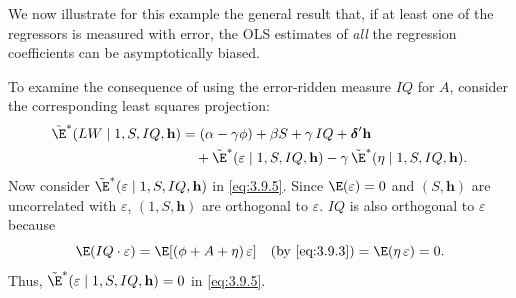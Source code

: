 We now illustrate for this example the general result that, if at least one of the
regressors is measured with error, the OLS estimates of \emph{all} the regression coefficients
can be asymptotically biased.

To examine the consequence of using the error-ridden measure $IQ$ for $A$, consider
the corresponding least squares projection:
\begin{align}
  \tilde{\E}^*(LW \mid 1, S, IQ, \mathbf{h})
  &= (\alpha - \gamma\phi) + \beta S + \gamma\, IQ + \boldsymbol{\delta}'\mathbf{h} \notag \\
  &\quad + \tilde{\E}^*(\varepsilon \mid 1, S, IQ, \mathbf{h})
    - \gamma\, \tilde{\E}^*(\eta \mid 1, S, IQ, \mathbf{h}).
  \label{eq:3.9.5}
\end{align}
Now consider $\tilde{\E}^*(\varepsilon \mid 1, S, IQ, \mathbf{h})$ in \eqref{eq:3.9.5}.
Since $\E(\varepsilon) = 0$ and $(S, \mathbf{h})$ are uncorrelated with $\varepsilon$,
$(1, S, \mathbf{h})$ are orthogonal to $\varepsilon$.  $IQ$ is also orthogonal to $\varepsilon$ because
\[
  \E(IQ \cdot \varepsilon) = \E[(\phi + A + \eta)\,\varepsilon]
  \quad \text{(by \eqref{eq:3.9.3})}
  = \E(\eta\,\varepsilon) = 0.
\]
Thus, $\tilde{\E}^*(\varepsilon \mid 1, S, IQ, \mathbf{h}) = 0$ in \eqref{eq:3.9.5}.

